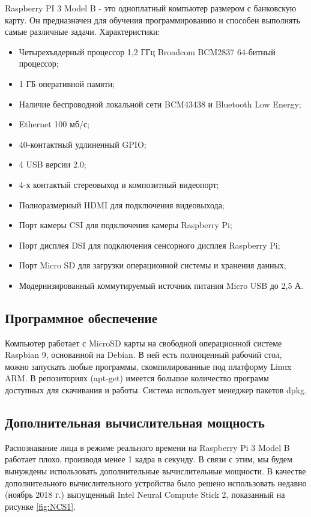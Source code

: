 \documentclass[14pt,a4paper]{scrartcl}
\begin{document}
		Raspberry PI 3 Model B - это одноплатный компьютер размером с банковскую карту. Он предназначен для обучения программированию и способен выполнять самые различные задачи\cite{bib:Raspberry_PI_Product_Page}.
		\newline \newline
		Характеристики:
		\begin{itemize}
			\item Четырехъядерный процессор 1,2 ГГц Broadcom BCM2837 64-битный процессор;
			\item 1 ГБ оперативной памяти;
			\item Наличие беспроводной локальной сети BCM43438 и Bluetooth Low Energy;
			\item Ethernet 100 мб/с;
			\item 40-контактный удлиненный GPIO;
			\item 4 USB версии 2.0;
			\item 4-х контактый стереовыход и композитный видеопорт;
			\item Полноразмерный HDMI для подключения видеовыхода;
			\item Порт камеры CSI для подключения камеры Raspberry Pi;
			\item Порт дисплея DSI для подключения сенсорного дисплея Raspberry Pi;
			\item Порт Micro SD для загрузки операционной системы и хранения данных;
			\item Модернизированный коммутируемый источник питания Micro USB до 2,5 А.
		\end{itemize}
	
	\subsection{Программное обеспечение}
	
		Компьютер работает с MicroSD карты на свободной операционной системе Raspbian 9, основанной на Debian. В ней есть полноценный рабочий стол, можно запускать любые программы, скомпилированные под платформу Linux ARM. В репозиториях (apt-get) имеется большое количество программ доступных для скачивания и работы. Система использует менеджер пакетов dpkg\cite{bib:Raspbian_Specs}.
	
	\subsection{Дополнительная вычислительная мощность}
	
		Распознавание лица в режиме реального времени на Raspberry Pi 3 Model B работает плохо, производя менее 1 кадра в секунду\cite{bib:Raspberry_Face_Recognition}. В связи с этим, мы будем вынуждены использовать дополнительные вычислительные мощности. В качестве дополнительного вычислительного устройства было решено использовать недавно (ноябрь 2018 г.) выпущенный Intel Neural Compute Stick 2, показанный на рисунке \ref{fig:NCS1}. 
		
\end{document}
